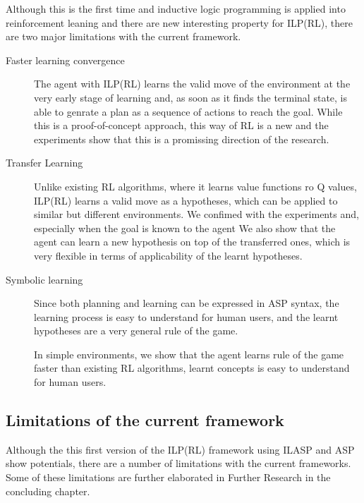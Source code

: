 Although this is the first time and inductive logic programming is applied into reinforcement leaning and there are new interesting property for ILP(RL),
there are two major limitations with the current framework.

\begin{description}
\item[Faster learning convergence]
The agent with ILP(RL) learns the valid move of the environment at the very early stage of learning and, as soon as it finds the terminal state, is able to genrate a plan as a sequence of actions to reach the goal.
While this is a proof-of-concept approach, this way of RL is a new and the experiments show that this is a promissing direction of the research.

\item[Transfer Learning]
Unlike existing RL algorithms, where it learns value functions ro Q values, ILP(RL) learns a valid move as a hypotheses, which can be applied to similar but different environments.
We confimed with the experiments and, especially when the goal is known to the agent
We also show that the agent can learn a new hypothesis on top of the transferred ones, which is very flexible in terms of applicability of the learnt hypotheses.

\item[Symbolic learning]
Since both planning and learning can be expressed in ASP syntax, the learning process is easy to understand for human users, and the learnt hypotheses are a very general rule of the game.

In simple environments, we show that the agent learns rule of the game faster than existing RL algorithms, learnt concepts is easy to understand for human users.
\end{description} 



\subsection{Limitations of the current framework}
\label{subsec:limitations}
Although the this first version of the ILP(RL) framework using ILASP and ASP show potentials, there are a number of limitations with the current frameworks.
Some of these limitations are further elaborated in Further Research in the concluding chapter.

